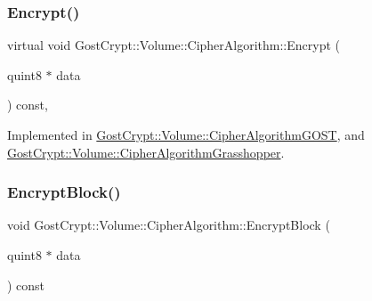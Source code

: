 \mbox{\label{class_gost_crypt_1_1_volume_1_1_cipher_algorithm_a4e8eda4efa7393fa17be1f5dae6cc0e2}} 
\subsubsection{\texorpdfstring{Encrypt()}{Encrypt()}}
{\footnotesize\ttfamily virtual void Gost\+Crypt\+::\+Volume\+::\+Cipher\+Algorithm\+::\+Encrypt (\begin{DoxyParamCaption}\item[{quint8 $\ast$}]{data }\end{DoxyParamCaption}) const\hspace{0.3cm}{\ttfamily [protected]}, {}}



Implemented in \hyperlink{class_gost_crypt_1_1_volume_1_1_cipher_algorithm_g_o_s_t_a9fc68f435da2c76dc944aa6bb36bddc5}{Gost\+Crypt\+::\+Volume\+::\+Cipher\+Algorithm\+G\+O\+ST}, and \hyperlink{class_gost_crypt_1_1_volume_1_1_cipher_algorithm_grasshopper_a51c5a99186cd497ccc3ac318018ffc89}{Gost\+Crypt\+::\+Volume\+::\+Cipher\+Algorithm\+Grasshopper}.

\mbox{\label{class_gost_crypt_1_1_volume_1_1_cipher_algorithm_aa5ac9c6cceb97f3fe109423716099d05}} 
\subsubsection{\texorpdfstring{Encrypt\+Block()}{EncryptBlock()}}
{\footnotesize\ttfamily void Gost\+Crypt\+::\+Volume\+::\+Cipher\+Algorithm\+::\+Encrypt\+Block (\begin{DoxyParamCaption}\item[{quint8 $\ast$}]{data }\end{DoxyParamCaption}) const\hspace{0.3cm}{\ttfamily [virtual]}}



